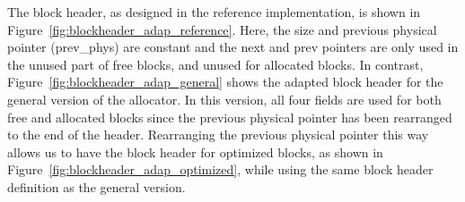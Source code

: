 The block header, as designed in the reference implementation, is shown in Figure~\ref{fig:blockheader_adap_reference}. Here, the size and previous physical pointer (prev\_phys) are constant and the next and prev pointers are only used in the unused part of free blocks, and unused for allocated blocks. In contrast, Figure~\ref{fig:blockheader_adap_general} shows the adapted block header for the general version of the allocator. In this version, all four fields are used for both free and allocated blocks since the previous physical pointer has been rearranged to the end of the header. Rearranging the previous physical pointer this way allows us to have the block header for optimized blocks, as shown in Figure~\ref{fig:blockheader_adap_optimized}, while using the same block header definition as the general version. 

